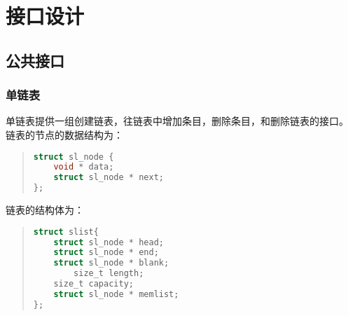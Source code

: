%
%
\section{接口设计}
\subsection{公共接口}
\subsubsection{单链表}
单链表提供一组创建链表，往链表中增加条目，删除条目，和删除链表的接口。
链表的节点的数据结构为：

\begin{quote}
\begin{lstlisting}[language={C}]
struct sl_node {
	void * data;
	struct sl_node * next;
};
\end{lstlisting}
\end{quote}

链表的结构体为：
\begin{quote}
\begin{lstlisting}[language={C}]
struct slist{
	struct sl_node * head;
	struct sl_node * end;
	struct sl_node * blank;
        size_t length;
	size_t capacity;
	struct sl_node * memlist; 
};
\end{lstlisting}
\end{quote}

